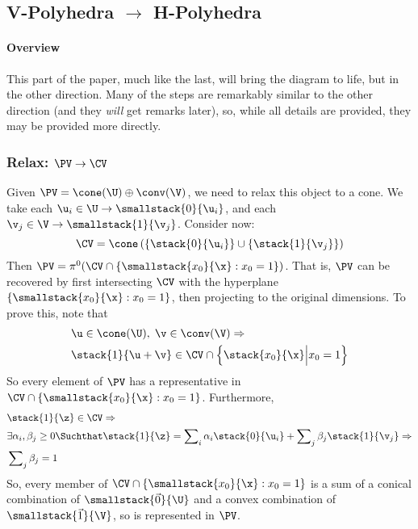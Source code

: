 
\subsection{V-Polyhedra $\to$ H-Polyhedra}
\paragraph{Overview}
This part of the paper, much like the last, will bring the diagram to life, but in the other direction.  Many of the steps are remarkably similar to the other direction (and they \textit{will} get remarks later), so, while all details are provided, they may be provided more directly.

\subsubsection{Relax: $\PV \to \CV$} 
Given $\PV = \cone(\U) \oplus \conv(\V)$, we need to relax this object to a cone.  We take each $\u_i \in \U \to \smallstack{0}{\u_i}$, and each $\v_j \in \V \to \smallstack{1}{\v_j}$.  Consider now:
  \[\CV = \cone\left(\left\{\stack{0}{\u_i}\right\} \cup 
                     \left\{\stack{1}{\v_j}\right\}\right)\]
Then $\PV = \pi^0(\CV \cap \{\smallstack{x_0}{\x} : x_0 = 1\})$.  That is, $\PV$ can be recovered by first intersecting $\CV$ with the hyperplane $\{\smallstack{x_0}{\x} : x_0 = 1\}$, then projecting to the original dimensions.  To prove this, note that 
\begin{align*}
& \u \in \cone(\U),\; \v \in \conv(\V) \Rightarrow \\
& \stack{1}{\u + \v} \in \CV \cap \left\{\stack{x_0}{\x} \Big| x_0 = 1\right\}
\end{align*}
So every element of $\PV$ has a representative in $\CV \cap \{\smallstack{x_0}{\x} : x_0 = 1\}$.  Furthermore,
\begin{align*}
& \stack{1}{\z} \in \CV \Rightarrow \\
& \exists \alpha_i, \beta_j \geq 0 \Suchthat \stack{1}{\z} = 
    \sum\nolimits_i \alpha_i \stack{0}{\u_i} + 
    \sum\nolimits_j \beta_j \stack{1}{\v_j} \Rightarrow \\
& \sum\nolimits_j \beta_j = 1
\end{align*}
So, every member of $\CV \cap \{\smallstack{x_0}{\x} : x_0 = 1\}$ is a sum of a conical combination of $\smallstack{\vec{0}}{\U}$ and a convex combination of $\smallstack{\vec{1}}{\V}$, so is represented in $\PV$.

